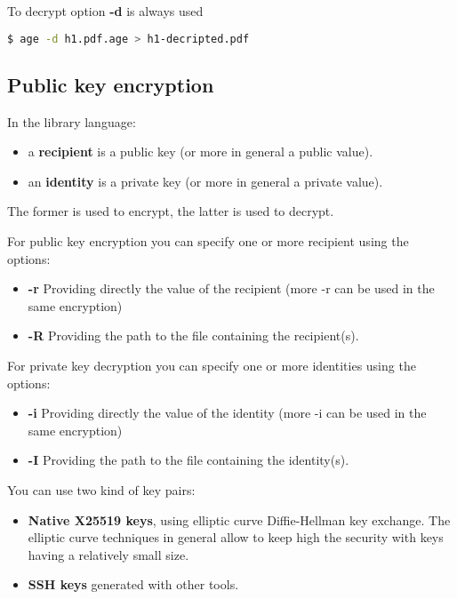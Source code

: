 \documentclass{article}
\begin{document}
	\noindent To decrypt option \textbf{-d} is always used
	\begin{lstlisting}[language=bash]
	$ age -d h1.pdf.age > h1-decripted.pdf
	\end{lstlisting}
	
	\subsection{Public key encryption}
	
	\noindent In the library language:
	\begin{itemize}
		\item  a \textbf{recipient} is a public key (or more in general a public value).
		\item  an \textbf{identity} is a private key (or more in general a private value).
	\end{itemize}
	
	The former is used to encrypt, the latter is used to decrypt.
	
	\noindent For public key encryption you can specify one or more recipient using the options:
	\begin{itemize}
		\item \textbf{-r} Providing directly the value of the recipient (more -r can be used in the same encryption)
		\item \textbf{-R} Providing the path to the file containing the recipient(s).
	\end{itemize}
	
	\noindent For private key decryption you can specify one or more identities using the options:
	\begin{itemize}
		\item \textbf{-i} Providing directly the value of the identity (more -i can be used in the same encryption)
		\item \textbf{-I} Providing the path to the file containing the identity(s).
	\end{itemize}
	
	\noindent You can use two kind of key pairs:
	\begin{itemize}
		\item \textbf{Native X25519 keys}, using elliptic curve Diffie-Hellman key exchange. 
		The elliptic curve techniques in general allow to keep high the security with keys having a relatively small size. 
		\item \textbf{SSH keys} generated with other tools.
	\end{itemize}	
	
\end{document}
